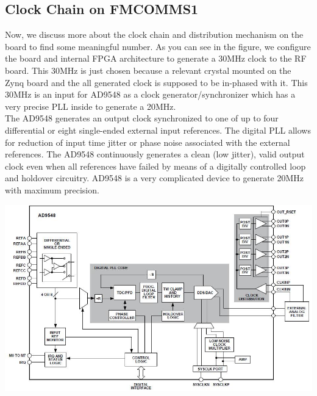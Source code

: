 \subsection{Clock Chain on FMCOMMS1}
Now, we discuss more about the clock chain and distribution mechanism on the board to find some meaningful number. As you can see in the figure, we configure the board and internal FPGA architecture to generate a 30MHz clock to the RF board. This 30MHz is just chosen because a relevant crystal mounted on the Zynq board and the all generated clock is supposed to be in-phased with it. This 30MHz is an input for AD9548 as a clock generator/synchronizer which has a very precise PLL inside to generate a 20MHz.\\
The AD9548 generates an output clock synchronized to one of up to four differential or eight single-ended external input references. The digital PLL allows for reduction of input time jitter or phase noise associated with the external references. The AD9548 continuously generates a clean (low jitter), valid output clock even when all references have failed by means of a digitally controlled loop and holdover circuitry. AD9548 is a very complicated device to generate 20MHz with maximum precision.\\

\begin{center}
\includegraphics[width=15cm]{content/fig/ad9548BlockDiagram.JPG}
\end{center}

